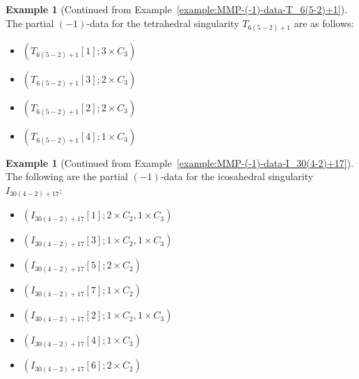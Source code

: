 \documentclass[reqno, twoside, a4paper]{amsart}
\theoremstyle{definition}
\newtheorem{example}[theorem]{Example}
\numberwithin{equation}{section}
\begin{document}
\begin{example}[Continued from Example~\ref{example:MMP-(-1)-data-T_6(5-2)+1}]

The partial $(-1)$-data for the tetrahedral singularity $T_{6(5-2)+1}$ are as follows:

\begin{multicols}{2}
\begin{itemize}
\item $(T_{6(5-2)+1}[1]; 3 \times C_3)$
\item $(T_{6(5-2)+1}[3]; 2 \times C_3)$
\end{itemize}

\columnbreak

\begin{itemize}
\item $(T_{6(5-2)+1}[2]; 2 \times C_3)$
\item $(T_{6(5-2)+1}[4]; 1 \times C_3)$
\end{itemize}
\end{multicols}

\end{example}

\begin{example}[Continued from Example~\ref{example:MMP-(-1)-data-I_30(4-2)+17}]

The following are the partial $(-1)$-data for the icosahedral singularity $I_{30(4-2)+17}$:

\begin{multicols}{2}
\begin{itemize}
\item $(I_{30(4-2)+17}[1]; 2 \times C_2, 1 \times C_3)$
\item $(I_{30(4-2)+17}[3]; 1 \times C_2, 1 \times C_3)$
\item $(I_{30(4-2)+17}[5]; 2 \times C_2)$
\item $(I_{30(4-2)+17}[7]; 1 \times C_2)$
\end{itemize}

\columnbreak

\begin{itemize}
\item $(I_{30(4-2)+17}[2]; 1 \times C_2, 1 \times C_3)$
\item $(I_{30(4-2)+17}[4]; 1 \times C_3)$
\item $(I_{30(4-2)+17}[6]; 2 \times C_2)$
\end{itemize}
\end{multicols}

\end{example}
\end{document}
